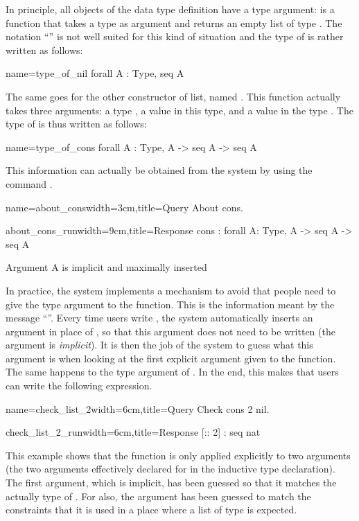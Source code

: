 In principle, all objects of the data type definition have a type
argument:  
 is a function that takes a type  as argument and returns
an empty list of type .  The notation ``'' is not
well suited for this kind of situation and the type of  is
rather written as follows:

\begin{coq}{name=type_of_nil}{}
  forall A : Type, seq A
\end{coq}
The same goes for the other constructor of list, named .  This
function actually takes three arguments: a type , a value in this
type, and a value in the type .  The type of  is
thus written as follows:

\begin{coq}{name=type_of_cons}{}
  forall A : Type, A -> seq A -> seq A
\end{coq}
This information can actually be obtained from the system by using the 
command .

\begin{coq}{name=about_cons}{width=3cm,title=Query}
About cons.
$~$
$~$
\end{coq}
\begin{coqout}{about_cons_run}{width=9cm,title=Response}
cons : forall A: Type, A -> seq A -> seq A

Argument A is implicit and maximally inserted
\end{coqout}

In practice, the \Coq{} system implements a mechanism to avoid that
people need to give the type argument to the  function.  This is
the information meant by the message ``''.  Every time users write , the system automatically
inserts an argument in place of , so that this argument does not
need to be written (the argument is {\em implicit}).  It is then the
job of the \Coq{} system to guess what this argument is when looking at
the first explicit argument given to the function.  The same happens
to the type argument of .  In the end, this makes that users can
write the following expression.

\begin{coq}{name=check_list_2}{width=6cm,title=Query}
Check cons 2 nil.
\end{coq}
\begin{coqout}{check_list_2_run}{width=6cm,title=Response}
[:: 2] : seq nat
\end{coqout}
\index[coq]{\C{(_ :: _)}}
This example shows that the function  is only applied
explicitly to two arguments (the two arguments effectively declared
for  in the inductive type declaration).
The first argument, which is implicit,
has been guessed so that it matches the actually type of .  For 
 also, the argument has been guessed to match the constraints
that it is used in a place where a list of type  is expected.  

